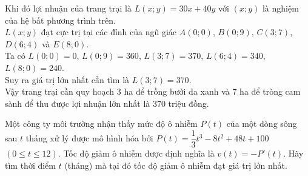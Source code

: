 \begin{ex}
{\begin{center}
		\end{center}
		Khi đó lợi nhuận của trang trại là $L(x;y)=30x+40y$ với $(x;y)$ là nghiệm của hệ bất phương trình trên.\\
		$L(x;y)$ đạt cực trị tại các đỉnh của ngũ giác $A(0;0)$, $B(0;9)$, $C(3;7)$, $D(6;4)$ và $E(8;0)$.\\
		Ta có $L(0;0)=0$, $L(0;9)=360$, $L(3;7)=370$, $L(6;4)=340$, $L(8;0)=240$.\\
		Suy ra giá trị lớn nhất cần tìm là $L(3;7)=370$.\\
		Vậy trang trại cần quy hoạch $3$ ha để trồng bưởi da xanh và $7$ ha để tròng cam sành để thu được lợi nhuận lớn nhất là $370$ triệu đồng.
	}
\end{ex}
\begin{ex}%
	Một công ty môi trường nhận thấy mức độ ô nhiễm $P(t)$ của một dòng sông sau $t$ tháng xử lý được mô hình hóa bởi $P(t)=\dfrac{1}{3}t^3-8t^2+48t+100$ $(0 \le t\le 12)$. Tốc độ giảm ô nhiễm được định nghĩa là $v(t)=-P'(t)$. Hãy tìm thời điểm $t$ (tháng) mà tại đó tốc độ giảm ô nhiễm đạt giá trị lớn nhất.
\end{ex}


